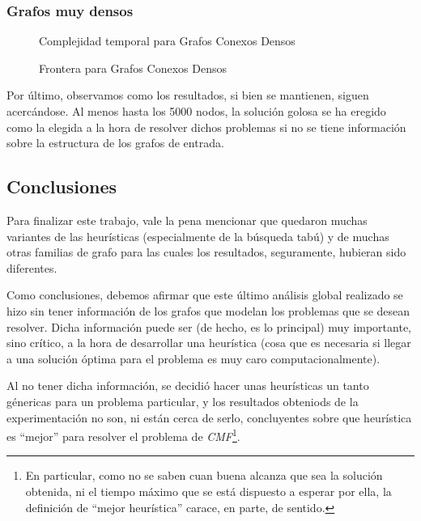 \subsubsection{Grafos muy densos}
\begin{figure}[H]
    \centering
    \fontsize{7}{10}\selectfont
    \resizebox{0.80\textwidth}{!}{}
    \caption{Complejidad temporal para Grafos Conexos Densos}
\end{figure}

\begin{figure}[H]
    \centering
    \fontsize{7}{10}\selectfont
    \resizebox{0.80\textwidth}{!}{}
    \caption{Frontera para Grafos Conexos Densos}
\end{figure}

\bigskip

\par Por \'ultimo, observamos como los resultados, si bien se mantienen,
    siguen acerc\'andose. Al menos hasta los 5000 nodos, la soluci\'on
    golosa se ha eregido como la elegida a la hora de resolver dichos
    problemas si no se tiene informaci\'on sobre la estructura de los
    grafos de entrada.

\subsection{Conclusiones}
\par Para finalizar este trabajo, vale la pena mencionar que quedaron
    muchas variantes de las heur\'isticas (especialmente de la b\'usqueda
    tab\'u) y de muchas otras familias de grafo para las cuales los
    resultados, seguramente, hubieran sido diferentes.

\par Como conclusiones, debemos afirmar que este \'ultimo an\'alisis
    global realizado se hizo sin tener informaci\'on de los grafos
    que modelan los problemas que se desean resolver. Dicha informaci\'on
    puede ser (de hecho, es lo principal) muy importante, sino cr\'itico,
    a la hora de desarrollar una heur\'istica (cosa que es necesaria
    si llegar a una soluci\'on \'optima para el problema es muy caro
    computacionalmente).

\par Al no tener dicha informaci\'on, se decidi\'o hacer unas heur\'isticas
    un tanto g\'enericas para un problema particular, y los resultados
    obteniods de la experimentaci\'on no son, ni est\'an cerca de serlo,
    concluyentes sobre que heur\'istica es ``mejor'' para resolver el
    problema de \emph{CMF}\footnote{En particular, como no se saben
    cuan buena alcanza que sea la soluci\'on obtenida, ni el tiempo
    m\'aximo que se est\'a dispuesto a esperar por ella, la definici\'on
    de ``mejor heur\'istica'' carace, en parte, de sentido.}.
